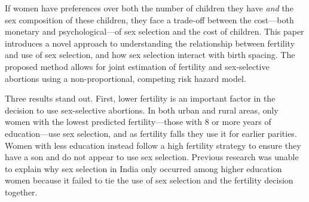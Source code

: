 \documentclass[12pt,letterpaper]{article}
\begin{document}
% 
% 
% 

If women have preferences over both the number of children they have \emph{and} the sex 
composition of these children, they face a trade-off between the cost---both monetary 
and psychological---of sex selection and the cost of children.
This paper introduces a novel approach to understanding the relationship between
fertility and use of sex selection, and how sex selection interact with birth spacing.
The proposed method allows for joint estimation of fertility and sex-selective abortions 
using a non-proportional, competing risk hazard model.

Three results stand out.
First, lower fertility is an important factor in the decision to use sex-selective abortions.
In both urban and rural areas, only women with the lowest predicted fertility---those
with 8 or more years of education---use sex selection, and as fertility falls they use it 
for earlier parities.
Women with less education instead follow a high fertility strategy to ensure they have
a son and do not appear to use sex selection.
Previous research was unable to explain why sex selection in India only occurred 
among higher education women because it failed to tie the use of sex selection and the 
fertility decision together.
\end{document}
